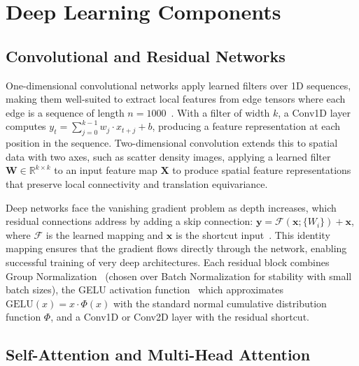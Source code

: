\section{Deep Learning Components}
\label{sec:deep_components}

\subsection{Convolutional and Residual Networks}
\label{sec:conv_resnet}

One-dimensional convolutional networks apply learned filters over 1D sequences, making them well-suited to extract local features from edge tensors where each edge is a sequence of length $n=1000$~\cite{he2016resnet}. With a filter of width $k$, a Conv1D layer computes $y_t=\sum_{j=0}^{k-1}w_j\cdot x_{t+j}+b$, producing a feature representation at each position in the sequence. Two-dimensional convolution extends this to spatial data with two axes, such as scatter density images, applying a learned filter $\mathbf{W}\in\mathbb{R}^{k\times k}$ to an input feature map $\mathbf{X}$ to produce spatial feature representations that preserve local connectivity and translation equivariance.

Deep networks face the vanishing gradient problem as depth increases, which residual connections address by adding a skip connection: $\mathbf{y}=\mathcal{F}(\mathbf{x};\{W_i\})+\mathbf{x}$, where $\mathcal{F}$ is the learned mapping and $\mathbf{x}$ is the shortcut input~\cite{he2016resnet}. This identity mapping ensures that the gradient flows directly through the network, enabling successful training of very deep architectures. Each residual block combines Group Normalization~\cite{wu2018groupnorm} (chosen over Batch Normalization for stability with small batch sizes), the GELU activation function~\cite{hendrycks2016gelu} which approximates $\mathrm{GELU}(x)=x\cdot\Phi(x)$ with the standard normal cumulative distribution function $\Phi$, and a Conv1D or Conv2D layer with the residual shortcut.

\subsection{Self-Attention and Multi-Head Attention}
\label{sec:attention}


